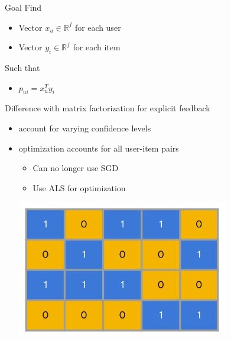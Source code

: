 \documentclass[aspectratio=1610]{beamer}
\begin{document}
\begin{frame}{Goal}
    Find
    \begin{itemize}
        \item Vector $x_u \in \mathbb{R}^f$ for each user
        \item Vector $y_i \in \mathbb{R}^f$ for each item
    \end{itemize}
    Such that
    \begin{itemize}
        \item $p_{ui} = x_{u}^{T} y_{i}$
    \end{itemize}
    Difference with matrix factorization for explicit feedback
    \begin{itemize}
        \item account for varying confidence levels
        \item optimization accounts for all user-item pairs
        \begin{minipage}[b][\textheight][t]{0.59\linewidth}
        \begin{itemize}
            \item Can no longer use SGD
            \item Use ALS for optimization
        \end{itemize}
        \end{minipage}
        \begin{minipage}[b][\textheight][t]{0.39\linewidth}
        \centering
        \includegraphics[trim={0 2cm 0 0},clip,width=\textwidth]{img/UnobservedEntries.jpg}
        \end{minipage}
    \end{itemize}

\end{frame}
\end{document}
